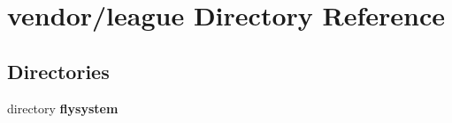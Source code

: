 \section{vendor/league Directory Reference}
\label{dir_1968c58e8f53cb4cb60bb9bb04ec72d6}
\subsection*{Directories}
\begin{DoxyCompactItemize}
\item 
directory {\bf flysystem}
\end{DoxyCompactItemize}

